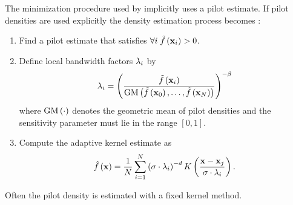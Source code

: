 The minimization procedure used by \citeauthor{breiman1977variable} implicitly uses a \KNN pilot estimate. If pilot densities are used explicitly the density estimation process becomes \cite{silverman1986density}:
	\begin{enumerate}[labelindent=0ex]
		\item Find a pilot estimate \varPilotDensityFunction{\varPattern} that satisfies $\forall i\; \varPilotDensityFunction{\varPattern[i]} > 0$. 

		\item Define local bandwidth factors $\lambda_{i}$ by
			\begin{equation}\label{eq:1:localBandwidth}
				\varLocalBandwidth{i} = \left( \frac{\varPilotDensityFunction{\varPattern[i]}}{\varGeometricMeanFunction{\varPilotDensityFunction{\varPattern[0]}, \dotsc, \varPilotDensityFunction{\varPattern[\varNumPatterns]}}}  \right)^{- \varMBESensitivityParam}
			\end{equation}
			where $\text{GM}\left(\cdot\right)$ denotes the geometric mean of pilot densities and the sensitivity parameter \varMBESensitivityParam must lie in the range $\left[0, 1\right]$.
		\item Compute the adaptive kernel estimate as
			\begin{equation}\label{eq:1:adaptiveKernelEstimateWithLocalBandwidths}
				\varEstimatedDensityFunction{\varPattern} = \frac{1}{\varNumPatterns} \sum_{i = 1}^{\varNumPatterns} \left(\varBandwidth \cdot \varLocalBandwidth{i}\right)^{-\varDim} \varKernel{\frac{\varPattern - \varPattern[j]}{\varBandwidth \cdot  \varLocalBandwidth{i}}}.
			\end{equation}
	\end{enumerate}
Often the pilot density is estimated with a fixed kernel method. 

